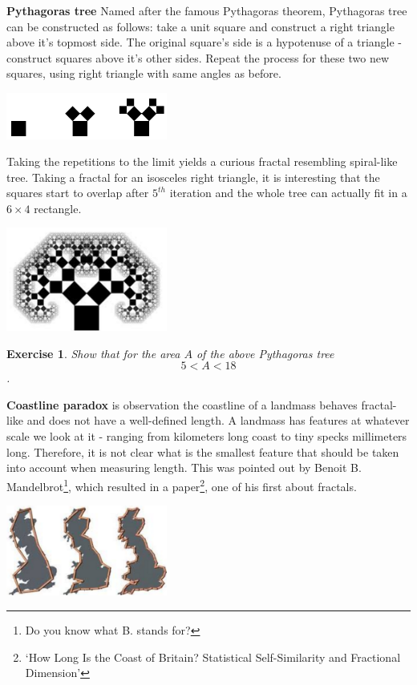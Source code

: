 \documentclass[12pt]{article}
\newtheorem{exercise}{Exercise}
\begin{document}
\textbf{Pythagoras tree} Named after the famous Pythagoras theorem, Pythagoras tree can be constructed as follows: take a unit square and construct a right triangle above it's topmost side. The original square's side is a hypotenuse of a triangle - construct squares above it's other sides. Repeat the process for these two new squares, using right triangle with same angles as before.
\centerline{\includegraphics[width = 200px]{tree_constr}}
Taking the repetitions to the limit yields a curious fractal resembling spiral-like tree. Taking a fractal for an isosceles right triangle, it is interesting that the squares start to overlap after $5^{th}$ iteration and the whole tree can actually fit in a $6 \times 4$ rectangle. \\
\centerline{\includegraphics[width = 200px]{tree}}
\begin{exercise}
Show that for the area $A$ of the above Pythagoras tree \[5 < A < 18\].
\end{exercise}

\noindent\textbf{Coastline paradox} is observation the coastline of a landmass behaves fractal-like and does not have a well-defined length. A landmass has features at whatever scale we look at it - ranging from kilometers long coast to tiny specks millimeters long. Therefore, it is not clear what is the smallest feature that should be taken into account when measuring length. This was pointed out by Benoit B. Mandelbrot\footnote{Do you know what B. stands for?}, which resulted in a paper\footnote{`How Long Is the Coast of Britain? Statistical Self-Similarity and Fractional Dimension'}, one of his first about fractals.\\
\centerline{\includegraphics[width = 200px]{coastline}}
\end{document}
